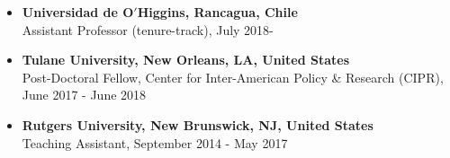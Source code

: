 \begin{itemize}
  \item[] {\bf Universidad de O$'$Higgins, Rancagua, Chile}\\
  Assistant Professor (tenure-track), July 2018-

  \item[] {\bf Tulane University, New Orleans, LA, United States}\\
  Post-Doctoral Fellow, Center for Inter-American Policy \& Research (CIPR), June 2017 - June 2018

  \item[] {\bf Rutgers University, New Brunswick, NJ, United States}\\
  Teaching Assistant, September 2014 - May 2017
\end{itemize}

